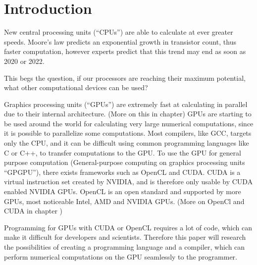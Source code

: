 \chapter{Introduction}\label{ch:introduction}

New central processing units (``CPUs'') are able to calculate at ever greater speeds.
Moore's law predicts an exponential growth in transistor count, thus faster computation, however experts predict that this trend may end as soon as 2020 or 2022. \citep{Moore2013}

This begs the question, if our processors are reaching their maximum potential, what other computational devices can be used?

Graphics processing units (``GPUs'') are extremely fast at calculating in parallel due to their internal architecture. (More on this in chapter)
GPUs are starting to be used around the world for calculating very large numerical computations, since it is possible to parallelize some computations.
Most compilers, like GCC, targets only the CPU, and it can be difficult using common programming languages like C or C++, to transfer computations to the GPU.
To use the GPU for general purpose computation (General-purpose computing on graphics processing units ``GPGPU''), there exists frameworks such as OpenCL and CUDA.
CUDA is a virtual instruction set created by NVIDIA, and is therefore only usable by CUDA enabled NVIDIA GPUs.
OpenCL is an open standard and supported by more GPUs, most noticeable Intel, AMD and NVIDIA GPUs. (More on OpenCl and CUDA in chapter )

Programming for GPUs with CUDA or OpenCL requires a lot of code, which can make it difficult for developers and scientists.
Therefore this paper will research the possibilities of creating a programming language and a compiler, which can perform numerical computations on the GPU seamlessly to the programmer. 

